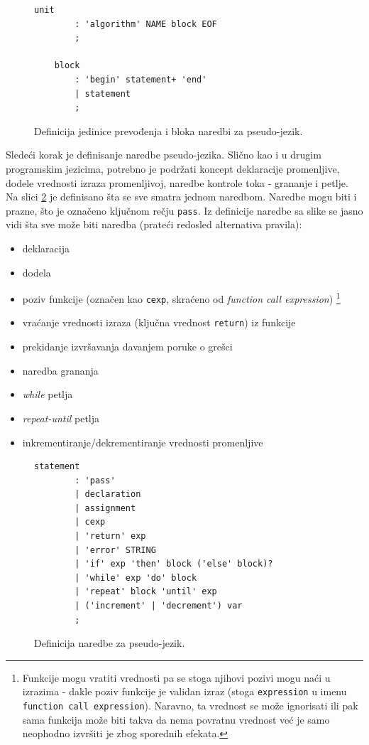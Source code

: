 \begin{figure}[h!]
    \begin{lstlisting}[language={}]
    unit
        : 'algorithm' NAME block EOF
        ;
    
    block
        : 'begin' statement+ 'end'
        | statement
        ;
    \end{lstlisting}
    \caption{Definicija jedinice prevođenja i bloka naredbi za pseudo-jezik.}
    \label{fig:PseudoDef1}
\end{figure}

Sledeći korak je definisanje naredbe pseudo-jezika. Slično kao i u drugim programskim jezicima, potrebno je podržati koncept deklaracije promenljive, dodele vrednosti izraza promenljivoj, naredbe kontrole toka - grananje i petlje. Na slici \ref{fig:PseudoDef2} je definisano šta se sve smatra jednom naredbom. Naredbe mogu biti i prazne, što je označeno ključnom rečju \texttt{pass}. Iz definicije naredbe sa slike se jasno vidi šta sve može biti naredba (prateći redosled alternativa pravila):
\begin{itemize}
    \item deklaracija
    \item dodela
    \item poziv funkcije (označen kao \texttt{cexp}, skraćeno od \emph{function call expression}) \footnote{Funkcije mogu vratiti vrednosti pa se stoga njihovi pozivi mogu naći u izrazima - dakle poziv funkcije je validan izraz (stoga \texttt{expression} u imenu \texttt{function call expression}). Naravno, ta vrednost se može ignorisati ili pak sama funkcija može biti takva da nema povratnu vrednost već je samo neophodno izvršiti je zbog sporednih efekata.}
    \item vraćanje vrednosti izraza (ključna vrednost \texttt{return}) iz funkcije
    \item prekidanje izvršavanja davanjem poruke o grešci
    \item naredba grananja
    \item \emph{while} petlja
    \item \emph{repeat-until} petlja
    \item inkrementiranje/dekrementiranje vrednosti promenljive
\end{itemize}
    
\begin{figure}[h!]
    \begin{lstlisting}[language={}]
    statement
        : 'pass'
        | declaration
        | assignment
        | cexp
        | 'return' exp
        | 'error' STRING
        | 'if' exp 'then' block ('else' block)? 
        | 'while' exp 'do' block 
        | 'repeat' block 'until' exp
        | ('increment' | 'decrement') var	
        ;
    \end{lstlisting}
    \caption{Definicija naredbe za pseudo-jezik.}
    \label{fig:PseudoDef2}
\end{figure}

